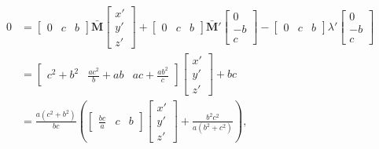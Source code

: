 \documentclass[preprint,12pt]{elsarticle}
\newcommand{\M}{\mathbf{M}}
\begin{document}
\begin{align*}
     0&=\begin{bmatrix}
            0 & c & b
        \end{bmatrix}\bar{\M}  \begin{bmatrix}
                    x'\\
                    y'\\
                    z'
                \end{bmatrix}+  \begin{bmatrix}
                                    0 & c & b
                                \end{bmatrix}\bar{\M}'   \begin{bmatrix}
                                                            0\\
                                                            -b\\
                                                            c
                                                        \end{bmatrix}-  \begin{bmatrix}
                                                                            0 & c & b
                                                                        \end{bmatrix}\lambda'   \begin{bmatrix}
                                                                                                    0\\
                                                                                                    -b\\
                                                                                                    c
                                                                                                \end{bmatrix}\nonumber\\
    &=  \begin{bmatrix}
            c^2+b^2 & \frac{ac^2}{b}+ab & ac+\frac{ab^2}{c}
        \end{bmatrix}   \begin{bmatrix}
                            x'\\
                            y'\\
                            z'
                        \end{bmatrix}+bc\nonumber\\
    &=\frac{a(c^2+b^2)}{bc}\left(\begin{bmatrix}
                                    \frac{bc}{a} & c & b
                                \end{bmatrix}   \begin{bmatrix}
                                                    x'\\
                                                    y'\\
                                                    z'
                                                \end{bmatrix}+\frac{b^2c^2}{a(b^2+c^2)}\right),
\end{align*}
\end{document}
